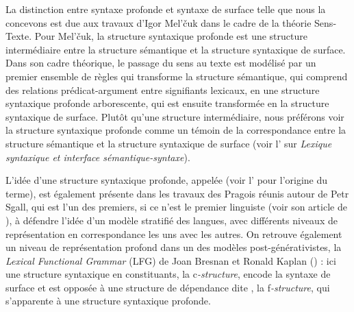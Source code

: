 {La distinction entre syntaxe profonde et syntaxe de surface telle que nous la concevons est due aux travaux d’Igor Mel’čuk dans le cadre de la théorie Sens-Texte. Pour Mel’čuk, la structure syntaxique profonde est une structure intermédiaire entre la structure sémantique et la structure syntaxique de surface. Dans son cadre théorique, le passage du sens au texte est modélisé par un premier ensemble de règles qui transforme la structure sémantique, qui comprend des relations prédicat-argument entre signifiants lexicaux, en une structure syntaxique profonde arborescente, qui est ensuite transformée en la structure syntaxique de surface. Plutôt qu’une structure intermédiaire, nous préférons voir la structure syntaxique profonde comme un témoin de la correspondance entre la structure sémantique et la structure syntaxique de surface (voir l’ sur \textit{Lexique syntaxique et interface sémantique-syntaxe}). 

L’idée d’une structure syntaxique profonde, appelée  (voir l’ pour l’origine du terme), est également présente dans les travaux des Pragois réunis autour de Petr Sgall, qui est l’un des premiers, si ce n’est le premier linguiste (voir son article de \citeyear{sgall1967functional}), à défendre l’idée d’un modèle stratifié des langues, avec différents niveaux de représentation en correspondance les uns avec les autres. On retrouve également un niveau de représentation profond dans un des modèles post-générativistes, la \textit{Lexical Functional Grammar} (LFG) de Joan Bresnan et Ronald Kaplan (\citeyear{kaplan1981functional}) : ici une structure syntaxique en constituants, la c\textit{-structure}, encode la syntaxe de surface et est opposée à une structure de dépendance dite , la f\textit{-structure}, qui s’apparente à une structure syntaxique profonde.

}
